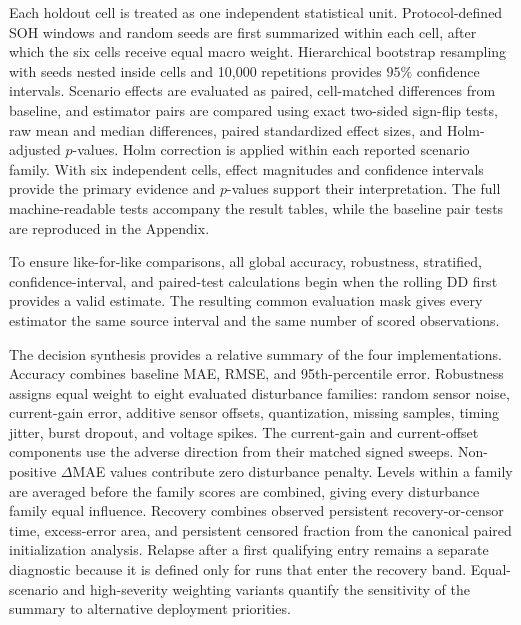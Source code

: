 \documentclass[review,nopreprintline]{elsarticle}
\begin{document}
Each holdout cell is treated as one independent statistical unit. Protocol-defined SOH windows and random seeds are first summarized within each cell, after which the six cells receive equal macro weight. Hierarchical bootstrap resampling with seeds nested inside cells and 10,000 repetitions provides $95\%$ confidence intervals. Scenario effects are evaluated as paired, cell-matched differences from baseline, and estimator pairs are compared using exact two-sided sign-flip tests, raw mean and median differences, paired standardized effect sizes, and Holm-adjusted $p$-values. Holm correction is applied within each reported scenario family. With six independent cells, effect magnitudes and confidence intervals provide the primary evidence and $p$-values support their interpretation. The full machine-readable tests accompany the result tables, while the baseline pair tests are reproduced in the Appendix.

To ensure like-for-like comparisons, all global accuracy, robustness, stratified, confidence-interval, and paired-test calculations begin when the rolling DD first provides a valid estimate. The resulting common evaluation mask gives every estimator the same source interval and the same number of scored observations.

The decision synthesis provides a relative summary of the four implementations. Accuracy combines baseline MAE, RMSE, and 95th-percentile error. Robustness assigns equal weight to eight evaluated disturbance families: random sensor noise, current-gain error, additive sensor offsets, quantization, missing samples, timing jitter, burst dropout, and voltage spikes. The current-gain and current-offset components use the adverse direction from their matched signed sweeps. Non-positive $\Delta$MAE values contribute zero disturbance penalty. Levels within a family are averaged before the family scores are combined, giving every disturbance family equal influence. Recovery combines observed persistent recovery-or-censor time, excess-error area, and persistent censored fraction from the canonical paired initialization analysis. Relapse after a first qualifying entry remains a separate diagnostic because it is defined only for runs that enter the recovery band. Equal-scenario and high-severity weighting variants quantify the sensitivity of the summary to alternative deployment priorities.
\end{document}

